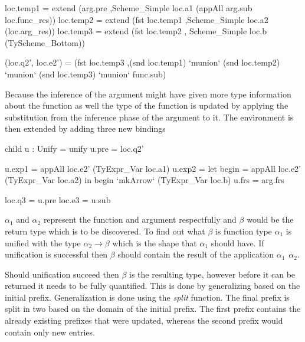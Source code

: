 \begin{code}
loc.temp1 = extend (arg.pre
                   ,Scheme_Simple loc.a1 (appAll arg.sub loc.func_res))
loc.temp2 = extend (fst loc.temp1
                   ,Scheme_Simple loc.a2 (loc.arg_res))
loc.temp3 = extend (fst loc.temp2
                   , Scheme_Simple loc.b  (TyScheme_Bottom))
    
(loc.q2', loc.e2') 
   = (fst loc.temp3
     ,(snd loc.temp1) `munion` (snd loc.temp2) `munion` (snd loc.temp3) `munion` func.sub)
\end{code}
Because the inference of the argument might have given more type information about the function as well the type of the function is updated by applying the substitution from the inference phase of the argument to it. The environment is then extended by adding three new bindings 

\begin{code}
child u : Unify = unify
u.pre   = loc.q2'
       
u.exp1  = appAll loc.e2' (TyExpr_Var loc.a1)
u.exp2  =  let begin = appAll loc.e2' (TyExpr_Var loc.a2)
           in begin `mkArrow` (TyExpr_Var loc.b)
u.frs   = arg.frs
       
loc.q3  = u.pre
loc.e3  = u.sub
\end{code}
$\alpha_1$ and $\alpha_2$ represent the function and argument respectfully and $\beta$ would be the return type which is to be discovered. To find out what $\beta$ is function type $\alpha_1$ is unified with the type $\alpha_2 \rightarrow \beta$ which is the shape that $\alpha_1$ should have. If unification is successful then $\beta$ should contain the result of the application $\alpha_1 \hspace{5pt} \alpha_2$.


Should unification succeed then $\beta$ is the resulting type, however before it can be returned it needs to be fully quantified. This is done by generalizing based on the initial prefix. Generalization is done using the \emph{split} function. The final prefix is split in two based on the domain of the initial prefix. The first prefix contains the already existing prefixes that were updated, whereas the second prefix would contain only new entries.

